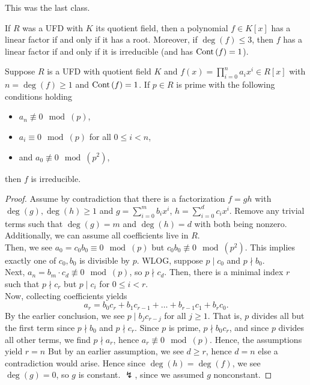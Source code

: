 This was the last class.
\begin{recall}
	If \(R\) was a UFD with \(K\) its quotient field, then a polynomial \(f \in K\left[ x \right] \) has a linear factor if and only if it has a root. Moreover, if \(\deg \left( f \right) \le 3\), then \(f\) has a linear factor if and only if it is irreducible (and has \(\operatorname{Cont}\left( f \right)  = 1\)).
\end{recall}
\begin{theorem}
	Suppose \(R\) is a UFD with quotient field \(K\) and \(f\left( x \right)  = \prod_{i= 0}^{n} a_{i} x^{i} \in R\left[ x \right]  \) with \(n = \deg \left( f \right)  \ge 1\) and \(\operatorname{Cont}\left( f \right) = 1\). If \(p \in R\) is prime with the following conditions holding
	\begin{itemize}
		\item \(a_{n} \not \equiv 0 \mod \left( p \right) \),
		\item \(a_{i} \equiv 0 \mod \left( p \right) \) for all \(0 \le i < n\),
		\item and \(a_0 \not \equiv 0 \mod \left( p^2 \right) \),
	\end{itemize}
then \(f\) is irreducible.
\end{theorem}
\begin{proof}
	Assume by contradiction that there is a factorization \(f = gh\) with \(\deg \left( g \right) , \deg \left( h \right) \ge 1\) and \(g = \sum_{i=0}^{m} b_{i}x^{i}\), \(h = \sum_{i=0}^{d} c_{i} x^{i}\). Remove any trivial terms such that \(\deg \left( g \right) = m\) and \(\deg \left( h \right) = d\) with both being nonzero. Additionally, we can assume all coefficients live in \(R\).\\
	Then, we see \(a_0 = c_0 b_0 \equiv 0 \mod \left( p \right) \) but \(c_0b_0 \not \equiv 0 \mod \left(p^2  \right) \). This implies exactly one of \(c_0, b_0\) is divisible by \(p\). WLOG, suppose \(p \mid c_0\) and \(p \nmid b_0\).\\
	Next, \(a_{n} = b_{m} \cdot c_{d} \not \equiv 0 \mod \left( p \right) \), so \(p \nmid c_{d}\). Then, there is a minimal index \(r\) such that \(p \nmid c_{r}\) but \(p \mid c_{i}\) for \(0 \le i < r\).\\
	Now, collecting coefficients yields \[
	a_{r} = b_0 c_{r} + b_1 c_{r-1} + \ldots + b_{r-1} c_1 + b_{r} c_0
	.\]
	By the earlier conclusion, we see \(p \mid b_{j} c_{r-j}\) for all \(j \ge 1\). That is, \(p\) divides all but the first term since \(p \nmid b_0\) and \(p \nmid c_{r}\). Since \(p\) is prime, \(p \nmid b_0 c_{r}\), and since \(p\) divides all other terms, we find \(p \nmid a_{r}\), hence \(a_{r} \not \equiv 0 \mod \left( p \right) \). Hence, the assumptions yield \(r = n\) But by an earlier assumption, we see \(d \ge r\), hence \(d = n\) else a contradiction would arise. Hence since \(\deg \left( h \right)  = \deg \left( f \right) \), we see \(\deg \left( g \right)  = 0\), so \(g\) is constant. \(\lightning\), since we assumed \(g\) nonconstant.
\end{proof}
